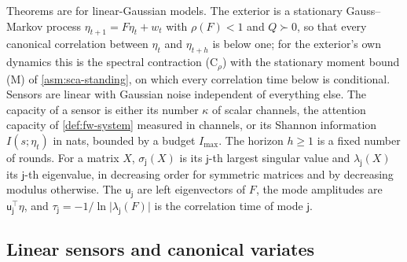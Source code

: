 Theorems are for linear-Gaussian models. The exterior is a stationary Gauss--Markov process $\eta_{t+1}=F\eta_t+w_t$ with $\rho(F)<1$ and $Q\succ0$, so that every canonical correlation between $\eta_t$ and $\eta_{t+h}$ is below one; for the exterior's own dynamics this is the spectral contraction (C$_\rho$) with the stationary moment bound (M) of \cref{asm:sca-standing}, on which every correlation time below is conditional. Sensors are linear with Gaussian noise independent of everything else. The capacity of a sensor is either its number $\kappa$ of scalar channels, the attention capacity of \cref{def:fw-system} measured in channels, or its Shannon information $I(s;\eta_t)$ in nats, bounded by a budget $I_{\max}$. The horizon $h\ge1$ is a fixed number of rounds. For a matrix $X$, $\sigma_{\mathsf j}(X)$ is its $\mathsf j$-th largest singular value and $\lambda_{\mathsf j}(X)$ its $\mathsf j$-th eigenvalue, in decreasing order for symmetric matrices and by decreasing modulus otherwise. The $\mathsf u_{\mathsf j}$ are left eigenvectors of $F$, the mode amplitudes are $\mathsf u_{\mathsf j}^\top\eta$, and $\tau_{\mathsf j}=-1/\ln\lvert\lambda_{\mathsf j}(F)\rvert$ is the correlation time of mode $\mathsf j$.

\subsection{Linear sensors and canonical variates}\label{sec:env-sensors}

